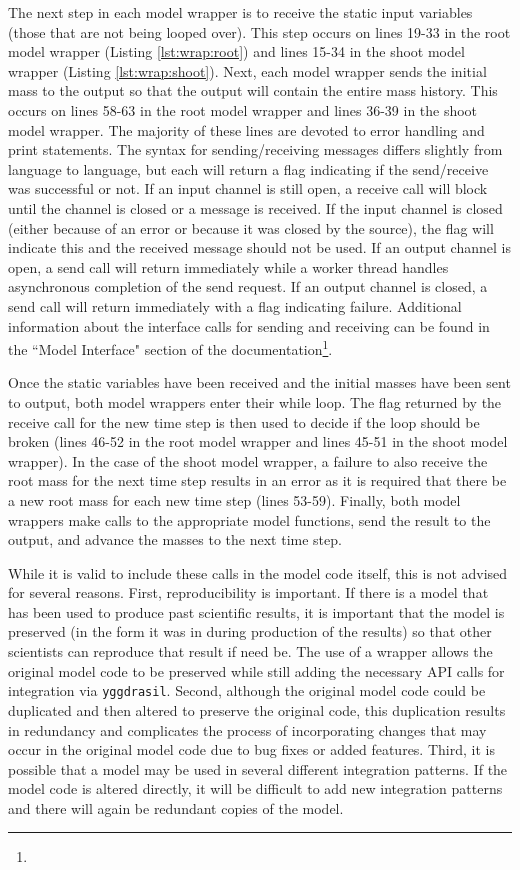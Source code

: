 \documentclass[journal]{IEEEtran}
\newcommand{\todo}[1]{{\color{red}{#1}}}
\newcommand{\pkg}{{\tt yggdrasil}{}}
\begin{document}
The next step in each model wrapper is to receive the static input variables (those that are not being looped over). This step occurs on lines 19-33 in the root model wrapper (Listing \ref{lst:wrap:root}) and lines 15-34 in the shoot model wrapper (Listing \ref{lst:wrap:shoot}). Next, each model wrapper sends the initial mass to the output so that the output will contain the entire mass history. This occurs on lines 58-63 in the root model wrapper and lines 36-39 in the shoot model wrapper. The majority of these lines are devoted to error handling and print statements. The syntax for sending/receiving messages differs slightly from language to language, but each will return a flag indicating if the send/receive was successful or not. If an input channel is still open, a receive call will block until the channel is closed or a message is received. If the input channel is closed (either because of an error or because it was closed by the source), the flag will indicate this and the received message should not be used. If an output channel is open, a send call will return immediately while a worker thread handles asynchronous completion of the send request. If an output channel is closed, a send call will return immediately with a flag indicating failure. Additional information about the interface calls for sending and receiving can be found in the ``Model Interface" section of the documentation\footnote{{\tt \todo{link}}}.

Once the static variables have been received and the initial masses have been sent to output, both model wrappers enter their while loop. The flag returned by the receive call for the new time step is then used to decide if the loop should be broken (lines 46-52 in the root model wrapper and lines 45-51 in the shoot model wrapper). In the case of the shoot model wrapper, a failure to also receive the root mass for the next time step results in an error as it is required that there be a new root mass for each new time step (lines 53-59). Finally, both model wrappers make calls to the appropriate model functions, send the result to the output, and advance the masses to the next time step.

While it is valid to include these calls in the model code itself, this is not advised for several reasons. First, reproducibility is important. If there is a model that has been used to produce past scientific results, it is important that the model is preserved (in the form it was in during production of the results) so that other scientists can reproduce that result if need be. The use of a wrapper allows the original model code to be preserved while still adding the necessary API calls for integration via {\pkg}. Second, although the original model code could be duplicated and then altered to preserve the original code, this duplication results in redundancy and complicates the process of incorporating changes that may occur in the original model code due to bug fixes or added features. Third, it is possible that a model may be used in several different integration patterns. If the model code is altered directly, it will be difficult to add new integration patterns and there will again be redundant copies of the model.
\end{document}
